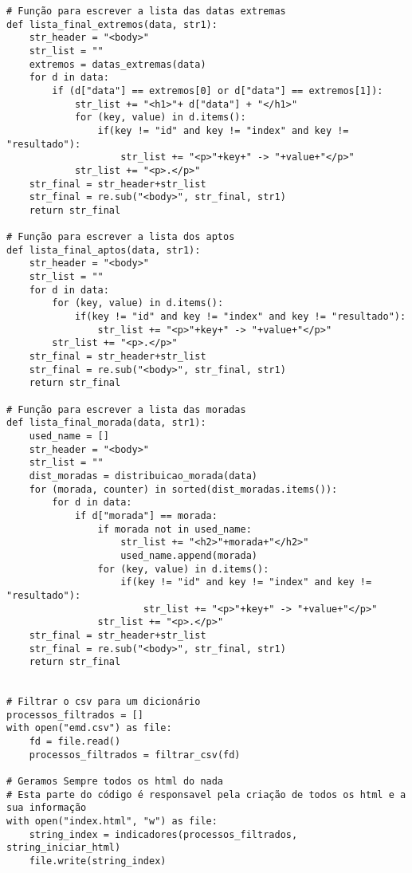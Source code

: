 \documentclass[11pt,a4paper]{report}%
\begin{document}
\begin{verbatim}
# Função para escrever a lista das datas extremas
def lista_final_extremos(data, str1):
    str_header = "<body>"
    str_list = ""
    extremos = datas_extremas(data)
    for d in data:
        if (d["data"] == extremos[0] or d["data"] == extremos[1]):
            str_list += "<h1>"+ d["data"] + "</h1>"
            for (key, value) in d.items():
                if(key != "id" and key != "index" and key != "resultado"):
                    str_list += "<p>"+key+" -> "+value+"</p>"
            str_list += "<p>.</p>"
    str_final = str_header+str_list
    str_final = re.sub("<body>", str_final, str1)
    return str_final 

# Função para escrever a lista dos aptos
def lista_final_aptos(data, str1):
    str_header = "<body>"
    str_list = ""
    for d in data:
        for (key, value) in d.items():
            if(key != "id" and key != "index" and key != "resultado"):
                str_list += "<p>"+key+" -> "+value+"</p>"
        str_list += "<p>.</p>"
    str_final = str_header+str_list
    str_final = re.sub("<body>", str_final, str1)
    return str_final

# Função para escrever a lista das moradas
def lista_final_morada(data, str1):
    used_name = []
    str_header = "<body>"
    str_list = ""
    dist_moradas = distribuicao_morada(data)
    for (morada, counter) in sorted(dist_moradas.items()):
        for d in data:
            if d["morada"] == morada:
                if morada not in used_name:
                    str_list += "<h2>"+morada+"</h2>"
                    used_name.append(morada)
                for (key, value) in d.items():
                    if(key != "id" and key != "index" and key != "resultado"):
                        str_list += "<p>"+key+" -> "+value+"</p>"
                str_list += "<p>.</p>"
    str_final = str_header+str_list
    str_final = re.sub("<body>", str_final, str1)
    return str_final


# Filtrar o csv para um dicionário
processos_filtrados = []
with open("emd.csv") as file:
    fd = file.read()
    processos_filtrados = filtrar_csv(fd)

# Geramos Sempre todos os html do nada
# Esta parte do código é responsavel pela criação de todos os html e a sua informação
with open("index.html", "w") as file:
    string_index = indicadores(processos_filtrados, string_iniciar_html)
    file.write(string_index)


\end{verbatim}
\end{document}
